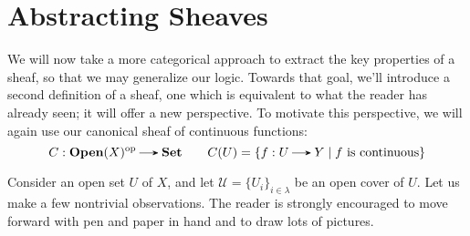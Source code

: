 \newpage
\section{Abstracting Sheaves}


We will now take a more categorical approach to extract the key 
properties of a sheaf, so that we may generalize our logic.
Towards that goal, we'll introduce a second definition of a sheaf, 
one which is equivalent to what the reader has already seen; it will offer a new 
perspective.
To motivate this perspective, we will again use our canonical sheaf of continuous functions: 
\[
    C: \textbf{Open}(X)\op \to \textbf{Set} \qquad C(U) = \{f: U \to Y \mid f \text{ is continuous}\}
\]

Consider an open set $U$ of $X$, and let $\mathcal{U} = \{U_i\}_{i \in \lambda}$ be an open cover 
of $U$. Let us make a few nontrivial observations. 
The reader is strongly encouraged to move forward with pen and paper in hand and to 
draw lots of pictures.
